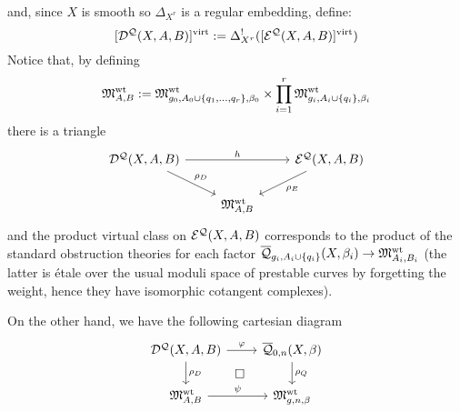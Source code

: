 and, since $X$ is smooth so $\Delta_{X^r}$ is a regular embedding, define:
\begin{equation*} [\mathcal{D^Q}(X,A,B)]^{\operatorname{virt}} := \Delta_{X^r}^! ([\mathcal{E^Q}(X,A,B)]^{\operatorname{virt}}) \end{equation*}
Notice that, by defining
\begin{equation*} \mathfrak M_{A,B}^{\operatorname{wt}} := \mathfrak M_{g_0,A_0\cup\{q_1,\ldots,q_r\},\beta_0}^{\operatorname{wt}} \times \prod_{i=1}^r \mathfrak M_{g_i,A_i\cup\{q_i\},\beta_i}^{\operatorname{wt}} \end{equation*}
there is a triangle
\begin{equation}\label{D-E-triangle}
 \begin{tikzcd}
  \D{X}{A}{B} \ar[dr,"\rho_D"]\ar[rr,"h"] & & \E{X}{A}{B}\ar[dl,"\rho_E"] \\
& \MM_{A,B}^{\operatorname{wt}} &
 \end{tikzcd}
\end{equation}
and the product virtual class on $\mathcal{E^Q}(X,A,B)$ corresponds to the product of the standard obstruction theories for each factor $\overline{\mathcal Q}_{g_i,A_i\cup\{q_i\}}(X,\beta_i)\rightarrow \mathfrak M_{A_i,B_i}^{\operatorname{wt}}$ (the latter is \'etale over the usual moduli space of prestable curves by forgetting the weight, hence they have isomorphic cotangent complexes).

On the other hand, we have the following cartesian diagram
\begin{equation} \label{Full quasimap diagram}
\begin{tikzcd}
\D{X}{A}{B} \ar[r,"\varphi"] \ar[d,"\rho_D"] \ar[rd,phantom,"\square"] & \Q{0}{n}{X}{\beta} \ar[d,"\rho_Q"] \\
\MM_{A,B}^{\operatorname{wt}} \ar[r,"\psi"] & \MM_{g,n,\beta}^{\operatorname{wt}}
\end{tikzcd}
\end{equation}

